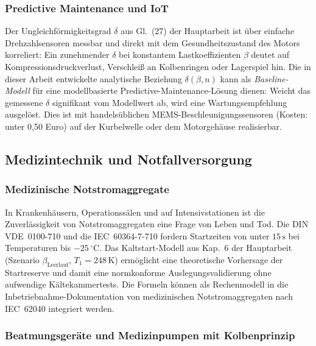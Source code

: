 ﻿\documentclass[a4paper,12pt]{article}
\begin{document}
\subsubsection{Predictive Maintenance und IoT}

Der Ungleichförmigkeitsgrad $\delta$ aus Gl.~(27) der Hauptarbeit
ist über einfache Drehzahlsensoren messbar und direkt mit dem
Gesundheitszustand des Motors korreliert: Ein zunehmender $\delta$
bei konstantem Lastkoeffizienten $\beta$ deutet auf Kompressionsdruckverlust,
Verschleiß an Kolbenringen oder Lagerspiel hin.
Die in dieser Arbeit entwickelte analytische Beziehung $\delta(\beta, n)$
kann als \textit{Baseline-Modell} für eine modellbasierte
Predictive-Maintenance-Lösung dienen: Weicht das gemessene $\delta$
signifikant vom Modellwert ab, wird eine Wartungsempfehlung ausgelöst.
Dies ist mit handelsüblichen MEMS-Beschleunigungssensoren
(Kosten: unter 0,50 Euro) auf der Kurbelwelle oder dem Motorgehäuse realisierbar.

\subsection{Medizintechnik und Notfallversorgung}

\subsubsection{Medizinische Notstromaggregate}

In Krankenhäusern, Operationssälen und auf Intensivstationen ist
die Zuverlässigkeit von Notstromaggregaten eine Frage von Leben und Tod.
Die DIN VDE~0100-710 und die IEC~60364-7-710 fordern Startzeiten
von unter $15\,\text{s}$ bei Temperaturen bis $-25\,^\circ\text{C}$.
Das Kaltstart-Modell aus Kap.~6 der Hauptarbeit
(Szenario $\beta_\text{Leerlauf}$, $T_1 = 248\,\text{K}$)
ermöglicht eine theoretische Vorhersage der Startreserve und damit
eine normkonforme Auslegungsvalidierung ohne aufwendige Kältekammertests.
Die Formeln können als Rechenmodell in die Inbetriebnahme-Dokumentation
von medizinischen Notstromaggregaten nach IEC~62040 integriert werden.

\subsubsection{Beatmungsgeräte und Medizinpumpen mit Kolbenprinzip}
\end{document}
